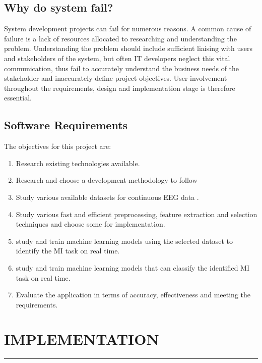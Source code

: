 \documentclass[12pt,a4paper]{report}
\begin{document}
	\section{Why do system fail?}
	\justify System development projects can fail for numerous reasons. A common cause of failure is a lack of resources allocated to researching and understanding the problem. Understanding the problem should include sufficient liaising with users and stakeholders of the system, but often IT developers neglect this vital communication, thus fail to accurately understand the business needs of the stakeholder and inaccurately define project objectives. User involvement throughout the requirements, design and implementation stage is therefore essential.
	\section{Software Requirements}
The objectives for this project are:
\begin{enumerate}
	\item Research existing technologies available.
	\item Research and choose a development methodology to follow
	\item Study various available datasets for continuous EEG data .
	\item Study various fast and efficient preprocessing, feature extraction and selection techniques and choose some for implementation.
	\item study and train machine learning models using the selected dataset to identify the MI task on real time.
	\item study and train machine learning models that can classify the identified MI task on real time. 
	\item Evaluate the application in terms of accuracy, effectiveness and meeting the requirements.
\end{enumerate}

	
	
	\newpage
	

	\chapter{IMPLEMENTATION}
	\rule{14.6cm}{.05cm}
\end{document}
